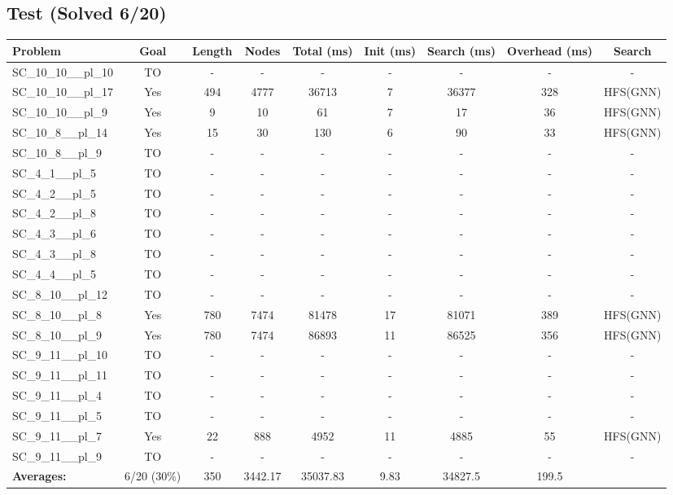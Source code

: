 \documentclass{article}
\begin{document}
\subsection*{Test (Solved 6/20)}
\begin{tabular}{lcccccccc}
\toprule
Problem & Goal & Length & Nodes & Total (ms) & Init (ms) & Search (ms) & Overhead (ms) & Search \\
\midrule
SC\_10\_10\_\_pl\_10 & TO & - & - & - & - & - & - & - \\
SC\_10\_10\_\_pl\_17 & Yes & 494 & 4777 & 36713 & 7 & 36377 & 328 & HFS(GNN) \\
SC\_10\_10\_\_pl\_9 & Yes & 9 & 10 & 61 & 7 & 17 & 36 & HFS(GNN) \\
SC\_10\_8\_\_pl\_14 & Yes & 15 & 30 & 130 & 6 & 90 & 33 & HFS(GNN) \\
SC\_10\_8\_\_pl\_9 & TO & - & - & - & - & - & - & - \\
SC\_4\_1\_\_pl\_5 & TO & - & - & - & - & - & - & - \\
SC\_4\_2\_\_pl\_5 & TO & - & - & - & - & - & - & - \\
SC\_4\_2\_\_pl\_8 & TO & - & - & - & - & - & - & - \\
SC\_4\_3\_\_pl\_6 & TO & - & - & - & - & - & - & - \\
SC\_4\_3\_\_pl\_8 & TO & - & - & - & - & - & - & - \\
SC\_4\_4\_\_pl\_5 & TO & - & - & - & - & - & - & - \\
SC\_8\_10\_\_pl\_12 & TO & - & - & - & - & - & - & - \\
SC\_8\_10\_\_pl\_8 & Yes & 780 & 7474 & 81478 & 17 & 81071 & 389 & HFS(GNN) \\
SC\_8\_10\_\_pl\_9 & Yes & 780 & 7474 & 86893 & 11 & 86525 & 356 & HFS(GNN) \\
SC\_9\_11\_\_pl\_10 & TO & - & - & - & - & - & - & - \\
SC\_9\_11\_\_pl\_11 & TO & - & - & - & - & - & - & - \\
SC\_9\_11\_\_pl\_4 & TO & - & - & - & - & - & - & - \\
SC\_9\_11\_\_pl\_5 & TO & - & - & - & - & - & - & - \\
SC\_9\_11\_\_pl\_7 & Yes & 22 & 888 & 4952 & 11 & 4885 & 55 & HFS(GNN) \\
SC\_9\_11\_\_pl\_9 & TO & - & - & - & - & - & - & - \\
\textbf{Averages:} & 6/20 (30\%) & 350 & 3442.17 & 35037.83 & 9.83 & 34827.5 & 199.5 & \\
\bottomrule
\end{tabular}
\\[0.7cm]
\end{document}
